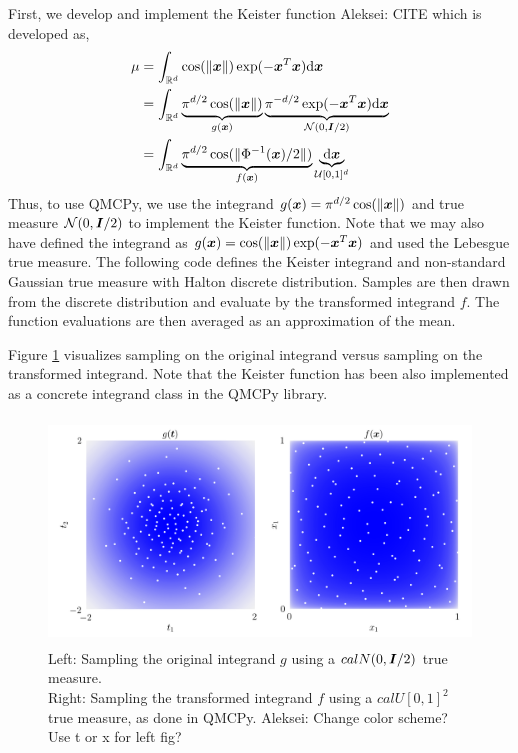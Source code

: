 \documentclass[graybox,footinfo]{svmult}
\newcommand{\AGSComment}[1]{{\color{cyan} Aleksei: #1}}
\begin{document}
First, we develop and implement the  Keister function \AGSComment{CITE} which is developed as, 
\begin{align*}
\mu 
&= \int_{\mathbb{R}^d} \cos(\lVert {\boldsymbol{x}} \rVert) \exp(-{\boldsymbol{x}}^T {\boldsymbol{x}}) \mathrm{d} {\boldsymbol{x}} \\ 
&= \int_{\mathbb{R}^d} \underbrace{\pi^{d/2} \cos(\lVert {\boldsymbol{x}} \rVert)}_{g({\boldsymbol{x}})} \underbrace{\pi^{-d/2} \exp(-{\boldsymbol{x}}^T {\boldsymbol{x}}) \mathrm{d} {\boldsymbol{x}}}_{{\mathcal{N}}(0,{\boldsymbol{I}}/2)} \\ 
&= \int_{\mathbb{R}^d} \underbrace{\pi^{d/2} \cos(\lVert \Phi^{-1}({\boldsymbol{x}})/2 \rVert)}_{f({\boldsymbol{x}})} \underbrace{\mathrm{d} {\boldsymbol{x}}}_{{\mathcal{U}}[0,1]^d}
\end{align*}
Thus, to use QMCPy, we use the integrand $g({\boldsymbol{x}}) = \pi^{d/2} \cos(\lVert {\boldsymbol{x}} \rVert)$ and true measure ${\mathcal{N}}(0,{\boldsymbol{I}}/2)$ to implement the Keister function. Note that we may also have defined the integrand as $g({\boldsymbol{x}}) = \cos(\lVert {\boldsymbol{x}} \rVert)\exp(-{\boldsymbol{x}}^T{\boldsymbol{x}})$ and used the Lebesgue true measure. The following code defines the Keister integrand and non-standard Gaussian true measure with Halton discrete distribution. Samples are then drawn from the discrete distribution and evaluate by the transformed integrand $f$. The function evaluations are then averaged as an approximation of the mean.

Figure \ref{fig:ikc} visualizes sampling on the original integrand versus sampling on the transformed integrand. Note that the Keister function has been also implemented as a concrete integrand class in the QMCPy library. 
\begin{figure}
	\includegraphics[height=6cm]{ags/figs/i.keister_contours.png}
	\caption{Left: Sampling the original integrand $g$ using a $calN(0,{\boldsymbol{I}}/2)$ true measure. \\ Right: Sampling the transformed integrand $f$ using a $calU[0,1]^2$ true measure, as done in QMCPy. \AGSComment{Change color scheme? Use t or x for left fig?}}
	\label{fig:ikc}
\end{figure}
\end{document}
